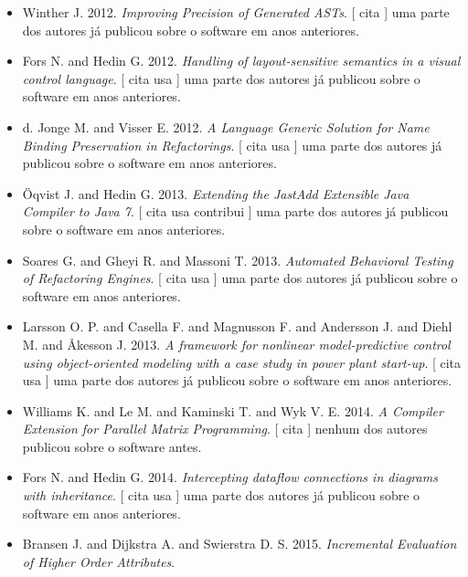 \begin{itemize}
      [
          cita
          usa
      ]
uma parte dos autores já publicou sobre o software em anos anteriores.
\item Winther J.
      2012.
        \textit{ Improving Precision of Generated ASTs}.
      [
          cita
      ]
uma parte dos autores já publicou sobre o software em anos anteriores.
\item Fors N. and Hedin G.
      2012.
        \textit{ Handling of layout-sensitive semantics in a visual control language}.
      [
          cita
          usa
      ]
uma parte dos autores já publicou sobre o software em anos anteriores.
\item d. Jonge M. and Visser E.
      2012.
        \textit{ A Language Generic Solution for Name Binding Preservation in Refactorings}.
      [
          cita
          usa
      ]
uma parte dos autores já publicou sobre o software em anos anteriores.
\item \"{O}qvist J. and Hedin G.
      2013.
        \textit{ Extending the JastAdd Extensible Java Compiler to Java 7}.
      [
          cita
          usa
          contribui
      ]
uma parte dos autores já publicou sobre o software em anos anteriores.
\item Soares G. and Gheyi R. and Massoni T.
      2013.
        \textit{ Automated Behavioral Testing of Refactoring Engines}.
      [
          cita
          usa
      ]
uma parte dos autores já publicou sobre o software em anos anteriores.
\item Larsson O. P. and Casella F. and Magnusson F. and Andersson J. and Diehl M. and Åkesson J.
      2013.
        \textit{ A framework for nonlinear model-predictive control using object-oriented modeling with a case study in power plant start-up}.
      [
          cita
          usa
      ]
uma parte dos autores já publicou sobre o software em anos anteriores.
\item Williams K. and Le M. and Kaminski T. and Wyk V. E.
      2014.
        \textit{ A Compiler Extension for Parallel Matrix Programming}.
      [
          cita
      ]
nenhum dos autores publicou sobre o software antes.
\item Fors N. and Hedin G.
      2014.
        \textit{ Intercepting dataflow connections in diagrams with inheritance}.
      [
          cita
          usa
      ]
uma parte dos autores já publicou sobre o software em anos anteriores.
\item Bransen J. and Dijkstra A. and Swierstra D. S.
      2015.
        \textit{ Incremental Evaluation of Higher Order Attributes}.

\end{itemize}
